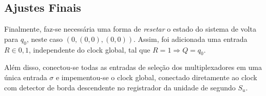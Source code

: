 \subsection{Ajustes Finais}

Finalmente, faz-se necessária uma forma de \textit{resetar} o estado do sistema de volta para $q_0$, neste caso $(0,(0,0),(0,0))$. 
Assim, foi adicionada uma entrada $R \in {0,1}$, independente do clock global, tal que $R = 1 \Rightarrow Q = q_0$. 

Além disso, conectou-se todas as entradas de seleção dos multiplexadores em uma única entrada $\sigma$ e impementou-se o clock global, conectado diretamente ao clock com detector de borda descendente no registrador da unidade de segundo $S_u$.



